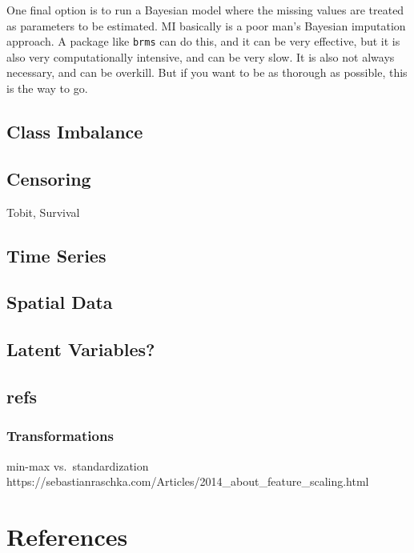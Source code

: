 \documentclass[
  letterpaper,
]{krantz}
\begin{document}
One final option is to run a Bayesian model where the missing values are
treated as parameters to be estimated. MI basically is a poor man's
Bayesian imputation approach. A package like \texttt{brms} can do this,
and it can be very effective, but it is also very computationally
intensive, and can be very slow. It is also not always necessary, and
can be overkill. But if you want to be as thorough as possible, this is
the way to go.

\section{Class Imbalance}\label{class-imbalance}

\section{Censoring}\label{censoring}

Tobit, Survival

\section{Time Series}\label{time-series}

\section{Spatial Data}\label{spatial-data}

\section{Latent Variables?}\label{latent-variables}

\section{refs}\label{refs-4}

\subsection{Transformations}\label{transformations}

min-max vs.~standardization
https://sebastianraschka.com/Articles/2014\_about\_feature\_scaling.html

\cleardoublepage
{}
{}
\appendix

\chapter{References}\label{references}
\end{document}
